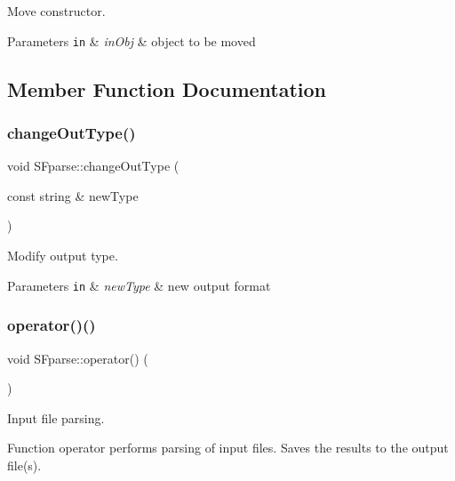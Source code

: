 Move constructor. 


\begin{DoxyParams}[1]{Parameters}
\mbox{\tt in}  & {\em in\+Obj} & object to be moved \\
\hline
\end{DoxyParams}


\subsection{Member Function Documentation}
\mbox{\label{class_s_fparse_aafdccb9f01902b2081e6891ccfc8bd49}} 
\subsubsection{\texorpdfstring{change\+Out\+Type()}{changeOutType()}}
{\footnotesize\ttfamily void S\+Fparse\+::change\+Out\+Type (\begin{DoxyParamCaption}\item[{const string \&}]{new\+Type }\end{DoxyParamCaption})\hspace{0.3cm}{\ttfamily [inline]}}



Modify output type. 


\begin{DoxyParams}[1]{Parameters}
\mbox{\tt in}  & {\em new\+Type} & new output format \\
\hline
\end{DoxyParams}
\mbox{\label{class_s_fparse_a2efd2115f5a579a4fccd25f9c4270c69}} 
\subsubsection{\texorpdfstring{operator()()}{operator()()}}
{\footnotesize\ttfamily void S\+Fparse\+::operator() (\begin{DoxyParamCaption}{ }\end{DoxyParamCaption})}



Input file parsing. 

Function operator performs parsing of input files. Saves the results to the output file(s). \mbox{\label{class_s_fparse_a5f7e978d765c8fb8735526fac38a301f}} 
